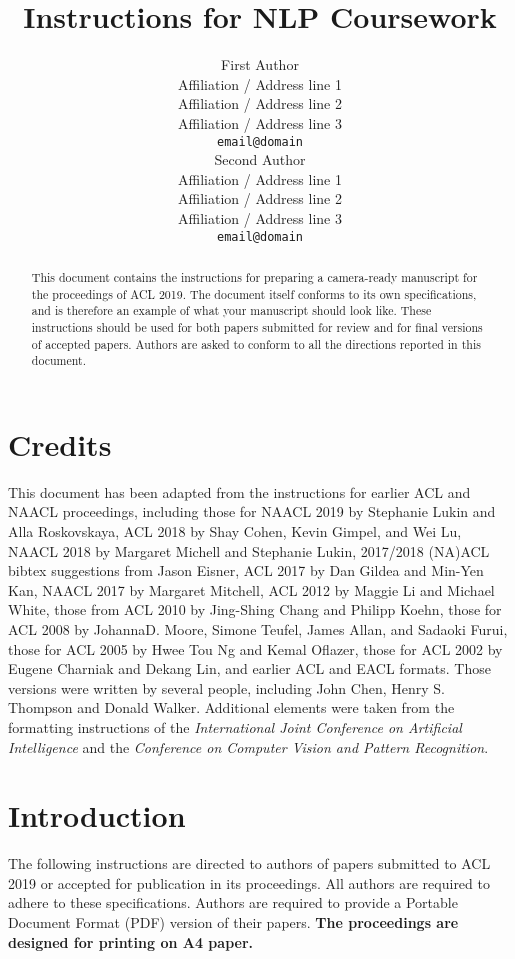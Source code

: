 \documentclass[11pt,a4paper]{article}
\title{Instructions for NLP Coursework}
\author{First Author \\
  Affiliation / Address line 1 \\
  Affiliation / Address line 2 \\
  Affiliation / Address line 3 \\
  \texttt{email@domain} \\\And
  Second Author \\
  Affiliation / Address line 1 \\
  Affiliation / Address line 2 \\
  Affiliation / Address line 3 \\
  \texttt{email@domain} \\}
\date{}
\begin{document}
\maketitle
\begin{abstract}
  This document contains the instructions for preparing a camera-ready
  manuscript for the proceedings of ACL 2019. The document itself
  conforms to its own specifications, and is therefore an example of
  what your manuscript should look like. These instructions should be
  used for both papers submitted for review and for final versions of
  accepted papers.  Authors are asked to conform to all the directions
  reported in this document.
\end{abstract}

\section{Credits}

This document has been adapted from the instructions
for earlier ACL and NAACL proceedings,
including 
those for 
NAACL 2019 by Stephanie Lukin and Alla Roskovskaya, 
ACL 2018 by Shay Cohen, Kevin Gimpel, and Wei Lu, 
NAACL 2018 by Margaret Michell and Stephanie Lukin,
2017/2018 (NA)ACL bibtex suggestions from Jason Eisner,
ACL 2017 by Dan Gildea and Min-Yen Kan, 
NAACL 2017 by Margaret Mitchell, 
ACL 2012 by Maggie Li and Michael White, 
those from ACL 2010 by Jing-Shing Chang and Philipp Koehn, 
those for ACL 2008 by JohannaD. Moore, Simone Teufel, James Allan, and Sadaoki Furui, 
those for ACL 2005 by Hwee Tou Ng and Kemal Oflazer, 
those for ACL 2002 by Eugene Charniak and Dekang Lin, 
and earlier ACL and EACL formats.
Those versions were written by several
people, including John Chen, Henry S. Thompson and Donald
Walker. Additional elements were taken from the formatting
instructions of the \emph{International Joint Conference on Artificial
  Intelligence} and the \emph{Conference on Computer Vision and
  Pattern Recognition}.

\section{Introduction}

The following instructions are directed to authors of papers submitted
to ACL 2019 or accepted for publication in its proceedings. All
authors are required to adhere to these specifications. Authors are
required to provide a Portable Document Format (PDF) version of their
papers. \textbf{The proceedings are designed for printing on A4
paper.}
\end{document}
